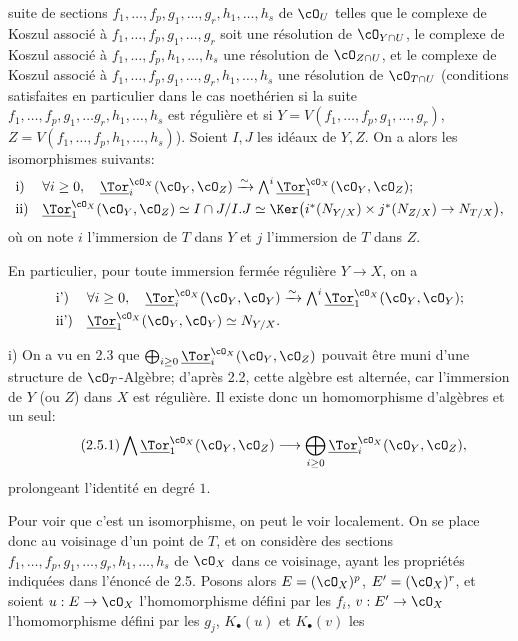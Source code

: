 suite de sections \(f_1,\ldots,f_p,g_1,\ldots,g_r,h_1,\ldots,h_s\) de \(\cO_U\) telles que le complexe de Koszul associé à \(f_1,\ldots,f_p,g_1,\ldots,g_r\) soit une résolution de \(\cO_{Y\cap U}\), le complexe de Koszul associé à \(f_1,\ldots,f_p,h_1,\ldots,h_s\) une résolution de \(\cO_{Z\cap U}\), et le complexe de Koszul associé à \(f_1,\ldots,f_p,g_1,\ldots,g_r,h_1,\ldots,h_s\) une résolution de \(\cO_{T\cap U}\) (conditions satisfaites en particulier dans le cas noethérien si la suite \(f_1,\ldots,f_p,g_1,\ldots g_r,h_1,\ldots,h_s\) est régulière et si \(Y=V(f_1,\ldots,f_p,g_1,\ldots,g_r)\), \(Z=V(f_1,\ldots,f_p,h_1,\ldots,h_s)\)). Soient \(I,J\) les idéaux de \(Y,Z\). On a alors les isomorphismes suivants:
\[
\begin{array}{ll}
\text{i)}& \forall i\ge0,\quad
\underline{\Tor}_i^{\cO_X}(\cO_Y,\cO_Z)\xrightarrow{\sim}
\bigwedge^i\underline{\Tor}_1^{\cO_X}(\cO_Y,\cO_Z);\\[0.8ex]
\text{ii)}&
\underline{\Tor}_1^{\cO_X}(\cO_Y,\cO_Z)\simeq
I\cap J/I.J\simeq
\Ker\bigl(i^*(N_{Y/X})\times j^*(N_{Z/X})\to N_{T/X}\bigr),
\end{array}
\]
où on note \(i\) l'immersion de \(T\) dans \(Y\) et \(j\) l'immersion de \(T\) dans \(Z\).

En particulier, pour toute immersion fermée régulière \(Y\to X\), on a
\[
\begin{array}{ll}
\text{i')}& \forall i\ge0,\quad
\underline{\Tor}_i^{\cO_X}(\cO_Y,\cO_Y)\xrightarrow{\sim}
\bigwedge^i\underline{\Tor}_1^{\cO_X}(\cO_Y,\cO_Y);\\[0.8ex]
\text{ii')}&
\underline{\Tor}_1^{\cO_X}(\cO_Y,\cO_Y)\simeq N_{Y/X}.
\end{array}
\]

i) On a vu en 2.3 que \(\bigoplus_{i\ge0}\underline{\Tor}_i^{\cO_X}(\cO_Y,\cO_Z)\) pouvait être muni d'une structure de \(\cO_T\)-Algèbre; d'après 2.2, cette algèbre est alternée, car l'immersion de \(Y\) (ou \(Z\)) dans \(X\) est régulière. Il existe donc un homomorphisme d'algèbres et un seul:
\begin{equation}\tag{2.5.1}
\bigwedge \underline{\Tor}_1^{\cO_X}(\cO_Y,\cO_Z)\longrightarrow
\bigoplus_{i\ge0}\underline{\Tor}_i^{\cO_X}(\cO_Y,\cO_Z),
\end{equation}
prolongeant l'identité en degré \(1\).

Pour voir que c'est un isomorphisme, on peut le voir localement. On se place donc au voisinage d'un point de \(T\), et on considère des sections \(f_1,\ldots,f_p,g_1,\ldots,g_r,h_1,\ldots,h_s\) de \(\cO_X\) dans ce voisinage, ayant les propriétés indiquées dans l'énoncé de 2.5. Posons alors \(E=(\cO_X)^p\), \(E'=(\cO_X)^r\), et soient \(u:E\to\cO_X\) l'homomorphisme défini par les \(f_i\), \(v:E'\to\cO_X\) l'homomorphisme défini par les \(g_j\), \(K_\bullet(u)\) et \(K_\bullet(v)\) les
